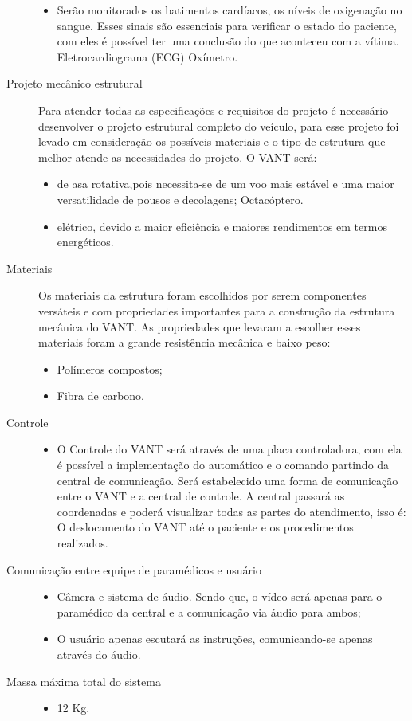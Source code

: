 \begin{description}
\begin{itemize}
	  \item Serão monitorados os batimentos cardíacos, os níveis de oxigenação no sangue. Esses sinais são essenciais para verificar o estado do paciente, com eles é possível ter uma conclusão do que aconteceu com a vítima. 
	    \subitem Eletrocardiograma (ECG)
	    \subitem Oxímetro.
  	\end{itemize}
  \item[Projeto mecânico estrutural] \hfill 
  
      Para atender todas as especificações e requisitos do projeto é necessário desenvolver o projeto estrutural completo do veículo, para esse projeto foi levado em consideração os possíveis materiais e o tipo de estrutura que melhor atende as necessidades do projeto.
  	O VANT será:
  	\begin{itemize}
  		\item de asa rotativa,pois necessita-se de um voo mais estável e uma maior versatilidade de pousos e decolagens;
		  \subitem Octacóptero.
		\item elétrico, devido a maior eficiência e maiores rendimentos em termos energéticos.
  	\end{itemize}
  \item[Materiais] \hfill 
  
  Os materiais da estrutura foram escolhidos por serem componentes versáteis e com propriedades importantes para a construção da estrutura mecânica do VANT. As propriedades que levaram a escolher esses materiais foram a grande resistência mecânica e baixo peso:
  	\begin{itemize}
  		\item Polímeros compostos;
		\item Fibra de carbono.
  	\end{itemize}
  \item[Controle] \hfill 
  	\begin{itemize}
  		\item O Controle do VANT será através de uma placa controladora, com ela é possível a implementação do automático e o comando partindo da central de comunicação. 
  		Será estabelecido uma forma de comunicação entre o VANT e a central de controle.
  		A central passará as coordenadas e poderá visualizar todas as partes do atendimento, isso é: O deslocamento do VANT até o paciente e os procedimentos realizados. 
  	\end{itemize}
  \item[Comunicação entre equipe de paramédicos e usuário] \hfill 
  	\begin{itemize}
  		\item Câmera e sistema de áudio. Sendo que, o vídeo será apenas para o paramédico da central e a comunicação via áudio para ambos;
  		\item O usuário apenas escutará as instruções, comunicando-se apenas através do áudio.
  	\end{itemize}
  	
  \item[Massa máxima total do sistema]\hfill
	  	\begin{itemize}
  		\item 12 Kg.
  	\end{itemize}
\end{description}